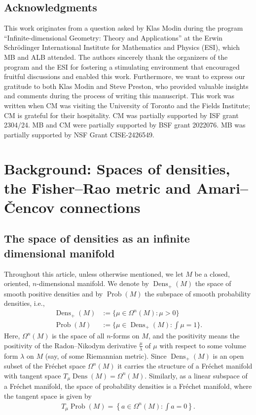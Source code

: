 \documentclass[11pt,reqno]{amsart}
\theoremstyle{definition}
\newcommand{\Prob}{\operatorname{Prob}(M)}
\newcommand{\Dens}{\operatorname{Dens}_+(M)}
\begin{document}
\subsection*{Acknowledgments}
This work originates from a question asked by Klas Modin during the program ``Infinite-dimensional Geometry: Theory and Applications'' at the Erwin Schrödinger International Institute for Mathematics and Physics (ESI), which MB and ALB attended. The authors sincerely thank the organizers of the program and the ESI for fostering a stimulating environment that encouraged fruitful discussions and enabled this work. Furthermore, we want to express our gratitude to both Klas Modin and Steve Preston, who provided valuable insights and comments during the process of writing this manuscript.
This work was written when CM was visiting the University of Toronto and the Fields Institute; CM is grateful
for their hospitality. 
CM was partially supported by ISF grant 2304/24.
MB and CM were partially supported by BSF grant 2022076. MB was partially supported by NSF Grant CISE-2426549.


\section{Background: Spaces of densities, the Fisher--Rao metric and Amari--\v{C}encov 
 connections}\label{sec:background}
\subsection{The space of densities as an infinite dimensional manifold}
Throughout this article, unless otherwise mentioned, we let $M$ be a closed, oriented, $n$-dimensional manifold. 
We denote by $\Dens$ the space of smooth positive densities and by $\Prob$ the subspace of smooth probability densities, i.e., 
\begin{align*}
\Dens&:=\{\mu\in \Omega^n(M) : \mu>0\}\\
\Prob&:=\{\mu\in \Dens : \int\mu=1\}.
\end{align*}
Here, $\Omega^n(M)$ is the space of all $n$-forms on $M$, and the positivity means the positivity of the Radon--Nikodym derivative $\frac{\mu}{\lambda}$ of $\mu$ with respect to some volume form $\lambda$ on $M$ (say, of some Riemannian metric).
Since $\Dens$ is an open subset of the Fr\'echet space $\Omega^n(M)$ it carries the structure of a Fr\'echet manifold with tangent space $T_{\mu}\operatorname{Dens}(M)=\Omega^n(M)$.
Similarly, as a linear subspace of a Fr\'echet manifold,  the space of probability densities is a Fr\'echet manifold, where the tangent space is given by 
\begin{align*}
T_{\mu}\Prob=\left\{a \in \Omega^n(M):\int a=0\right\}.
\end{align*}
\end{document}
